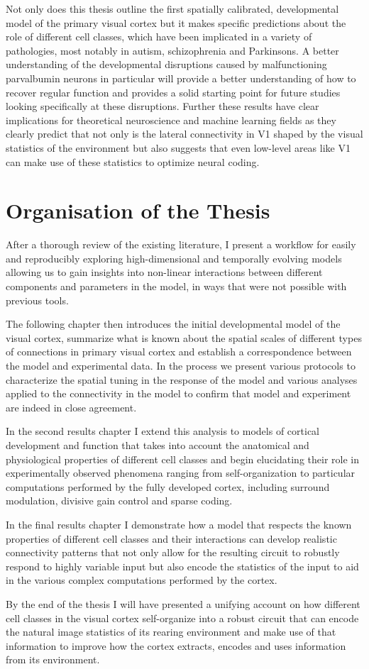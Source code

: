 Not only does this thesis outline the first spatially calibrated,
developmental model of the primary visual cortex but it makes specific
predictions about the role of different cell classes, which have been
implicated in a variety of pathologies, most notably in autism,
schizophrenia and Parkinsons. A better understanding of the
developmental disruptions caused by malfunctioning parvalbumin neurons
in particular will provide a better understanding of how to recover
regular function and provides a solid starting point for future
studies looking specifically at these disruptions. Further these
results have clear implications for theoretical neuroscience and
machine learning fields as they clearly predict that not only is the
lateral connectivity in V1 shaped by the visual statistics of the
environment but also suggests that even low-level areas like V1 can
make use of these statistics to optimize neural coding.

\section{Organisation of the Thesis}

After a thorough review of the existing literature, I present a
workflow for easily and reproducibly exploring high-dimensional and
temporally evolving models allowing us to gain insights into
non-linear interactions between different components and parameters in
the model, in ways that were not possible with previous tools.

The following chapter then introduces the initial developmental model
of the visual cortex, summarize what is known about the spatial scales
of different types of connections in primary visual cortex and
establish a correspondence between the model and experimental data. In
the process we present various protocols to characterize the spatial
tuning in the response of the model and various analyses applied to
the connectivity in the model to confirm that model and experiment are
indeed in close agreement.

In the second results chapter I extend this analysis to models of
cortical development and function that takes into account the
anatomical and physiological properties of different cell classes and
begin elucidating their role in experimentally observed phenomena
ranging from self-organization to particular computations performed by
the fully developed cortex, including surround modulation, divisive
gain control and sparse coding.

In the final results chapter I demonstrate how a model that respects
the known properties of different cell classes and their interactions
can develop realistic connectivity patterns that not only allow for
the resulting circuit to robustly respond to highly variable input but
also encode the statistics of the input to aid in the various complex
computations performed by the cortex.

By the end of the thesis I will have presented a unifying account on
how different cell classes in the visual cortex self-organize into a
robust circuit that can encode the natural image statistics of its
rearing environment and make use of that information to improve how
the cortex extracts, encodes and uses information from its
environment.

